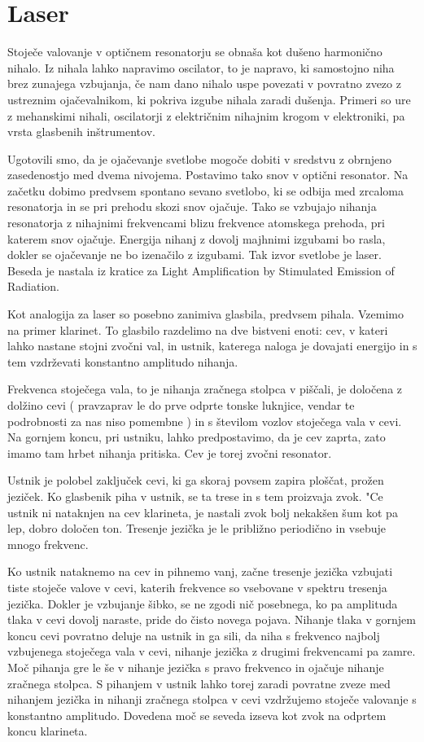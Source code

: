 \chapter{Laser}

Stoječe valovanje v optičnem resonatorju se obnaša kot dušeno
harmonično nihalo. Iz nihala lahko napravimo oscilator, to je napravo, ki
samostojno niha brez zunajega vzbujanja, če nam dano nihalo uspe povezati v
povratno zvezo z ustreznim ojačevalnikom, ki pokriva izgube nihala zaradi
dušenja. Primeri so ure z mehanskimi nihali, oscilatorji z električnim
nihajnim krogom v elektroniki, pa vrsta glasbenih inštrumentov.

Ugotovili smo, da je ojačevanje svetlobe mogoče dobiti v sredstvu z
obrnjeno zasedenostjo med dvema nivojema. Postavimo tako snov v optični
resonator. Na začetku dobimo predvsem spontano sevano svetlobo, ki se
odbija med zrcaloma resonatorja in se pri prehodu skozi snov ojačuje. Tako
se vzbujajo nihanja resonatorja z nihajnimi frekvencami blizu frekvence
atomskega prehoda, pri katerem snov ojačuje. Energija nihanj z dovolj
majhnimi izgubami bo rasla, dokler se ojačevanje ne bo izenačilo z
izgubami. Tak izvor svetlobe je laser. Beseda je nastala iz kratice za Light
Amplification by Stimulated Emission of Radiation.

Kot analogija za laser so posebno zanimiva glasbila, predvsem pihala.
Vzemimo na primer klarinet. To glasbilo razdelimo na dve bistveni enoti:
cev, v kateri lahko nastane stojni zvočni val, in ustnik, katerega naloga
je dovajati energijo in s tem vzdrževati konstantno amplitudo nihanja.

Frekvenca stoječega vala, to je nihanja zračnega stolpca v piščali, je
določena z dolžino cevi ( pravzaprav le do prve odprte tonske luknjice,
vendar te podrobnosti za nas niso pomembne ) in s številom vozlov
stoječega vala v cevi. Na gornjem koncu, pri ustniku, lahko predpostavimo,
da je cev zaprta, zato imamo tam hrbet nihanja pritiska. Cev je torej
zvočni resonator.

Ustnik je polobel zaključek cevi, ki ga skoraj povsem zapira ploščat,
prožen jeziček. Ko glasbenik piha v ustnik, se ta trese in s tem proizvaja
zvok. "Ce ustnik ni nataknjen na cev klarineta, je nastali zvok bolj
nekakšen šum kot pa lep, dobro določen ton. Tresenje jezička je le
približno periodično in vsebuje mnogo frekvenc.

Ko ustnik nataknemo na cev in pihnemo vanj, začne tresenje jezička
vzbujati tiste stoječe valove v cevi, katerih frekvence so vsebovane v
spektru tresenja jezička. Dokler je vzbujanje šibko, se ne zgodi nič
posebnega, ko pa amplituda tlaka v cevi dovolj naraste, pride do čisto
novega pojava. Nihanje tlaka v gornjem koncu cevi povratno deluje na ustnik
in ga sili, da niha s frekvenco najbolj vzbujenega stoječega vala v cevi,
nihanje jezička z drugimi frekvencami pa zamre. Moč pihanja gre le še v
nihanje jezička s pravo frekvenco in ojačuje nihanje zračnega stolpca. S
pihanjem v ustnik lahko torej zaradi povratne zveze med nihanjem jezička in
nihanji zračnega stolpca v cevi vzdržujemo stoječe valovanje s konstantno
amplitudo. Dovedena moč se seveda izseva kot zvok na odprtem koncu
klarineta.

